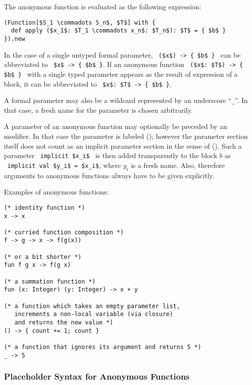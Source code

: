 The anonymous function is evaluated as the following expression:
\begin{lstlisting}
(Function[$S_1 \commadots S_n$, $T$] with {
  def apply ($x_1$: $T_1 \commadots x_n$: $T_n$): $T$ = { $b$ }
}).new
\end{lstlisting}

In the case of a single untyped formal parameter, ~\lstinline!($x$) -> { $b$ }!~ can be abbreviated to ~\lstinline!$x$ -> { $b$ }!. If an anonymous function ~\lstinline!($x$: $T$) -> { $b$ }!~ with a single typed parameter appears as the result of expression of a block, it can be abbreviated to ~\lstinline!$x$: $T$ -> { $b$ }!.

A formal parameter may also be a wildcard represented by an underscore ``\lstinline!_!''. In that case, a fresh name for the parameter is chosen arbitrarily. 

A parameter of an anonymous function may optionally be preceded by an  modifier. In that case the parameter is labeled  (); however the parameter section itself does not count as an implicit parameter section in the sense of (). Such a parameter ~\lstinline!implicit $x_i$!~ is then added transparently to the block $b$ as ~\lstinline!implicit val $y_i$ = $x_i$!, where $y_i$ is a fresh name. Also, therefore arguments to anonymous functions always have to be given explicitly. 

\example Examples of anonymous functions:
\begin{lstlisting}[mathescape=false]
(* identity function *)
x -> x

(* curried function composition *)
f -> g -> x -> f(g(x))

(* or a bit shorter *)
fun f g x -> f(g x)

(* a summation function *)
fun (x: Integer) (y: Integer) -> x + y

(* a function which takes an empty parameter list,
   increments a non-local variable (via closure)
   and returns the new value *)
() -> { count += 1; count }

(* a function that ignores its argument and returns 5 *)
_ -> 5 
\end{lstlisting}





\subsubsection{Placeholder Syntax for Anonymous Functions}
\label{sec:placeholder-functions}

